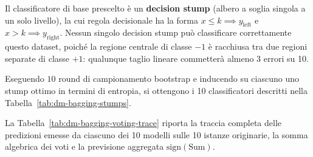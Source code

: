 Il classificatore di base prescelto è un \textbf{decision stump} (albero a soglia singola a un solo livello), la cui regola decisionale ha la forma $x \le k \implies y_{\text{left}}$ e $x > k \implies y_{\text{right}}$. Nessun singolo decision stump può classificare correttamente questo dataset, poiché la regione centrale di classe $-1$ è racchiusa tra due regioni separate di classe $+1$: qualunque taglio lineare commetterà almeno 3 errori su 10.

Eseguendo $10$ round di campionamento bootstrap e inducendo su ciascuno uno stump ottimo in termini di entropia, si ottengono i 10 classificatori descritti nella Tabella~\ref{tab:dm-bagging-stumps}.

\begin{table}[H]
\centering
\caption{Specifiche dei 10 decision stump indotti sui rispettivi campioni bootstrap.}
\label{tab:dm-bagging-stumps}
\vspace{2mm}
\end{table}

La Tabella~\ref{tab:dm-bagging-voting-trace} riporta la traccia completa delle predizioni emesse da ciascuno dei 10 modelli sulle 10 istanze originarie, la somma algebrica dei voti e la previsione aggregata $\text{sign}(\text{Sum})$.

